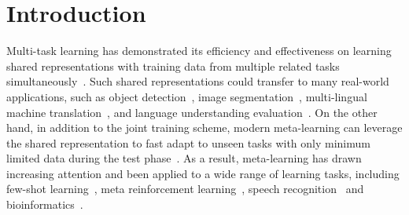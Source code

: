 \documentclass{article}
\begin{document}
\section{Introduction}\label{sec:intro}
Multi-task learning has demonstrated its efficiency and effectiveness on learning shared representations with training data from multiple related tasks simultaneously~\cite{caruana1997multitask,ruder2017overview,overview-mtl}. Such shared representations could transfer to many real-world applications, such as object detection~\cite{zhang2014facial}, image segmentation~\cite{kendall2018multi}, multi-lingual machine translation~\cite{dong2015multi}, and language understanding evaluation~\cite{wang2018glue}.
On the other hand, in addition to the joint training scheme, modern meta-learning can leverage the shared representation to fast adapt to unseen tasks with only minimum limited data during the test phase~\cite{hospedales2020metalearning}. As a result, meta-learning has drawn increasing attention and been applied to a wide range of learning tasks, including few-shot learning~\cite{snell2017prototypical,matching-net,metaOptNet}, meta reinforcement learning~\cite{maml}, speech recognition~\cite{hsu2020meta} and bioinformatics~\cite{luo2019mitigating}.
\end{document}
